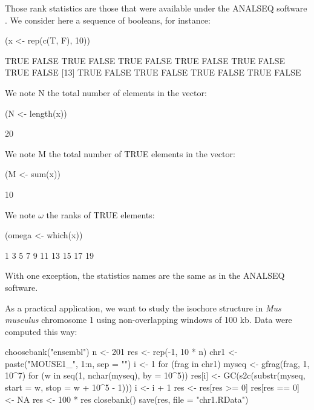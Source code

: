 \documentclass{article}
\begin{document}
Those rank statistics are those that were available under the ANALSEQ
software \cite{analseq, acnuc1984}. We consider here a sequence
of booleans, for instance:

\begin{Schunk}
\begin{Sinput}
 (x <- rep(c(T, F), 10))
\end{Sinput}
\begin{Soutput}
 [1]  TRUE FALSE  TRUE FALSE  TRUE FALSE  TRUE FALSE  TRUE FALSE  TRUE FALSE
[13]  TRUE FALSE  TRUE FALSE  TRUE FALSE  TRUE FALSE
\end{Soutput}
\end{Schunk}

We note $\mathrm{N}$ the total number of elements in the vector:

\begin{Schunk}
\begin{Sinput}
 (N <- length(x))
\end{Sinput}
\begin{Soutput}
[1] 20
\end{Soutput}
\end{Schunk}

We note $\mathrm{M}$ the total number of TRUE elements in the vector:

\begin{Schunk}
\begin{Sinput}
 (M <- sum(x))
\end{Sinput}
\begin{Soutput}
[1] 10
\end{Soutput}
\end{Schunk}

We note $\omega$ the ranks of TRUE elements:

\begin{Schunk}
\begin{Sinput}
 (omega <- which(x))
\end{Sinput}
\begin{Soutput}
 [1]  1  3  5  7  9 11 13 15 17 19
\end{Soutput}
\end{Schunk}

With one exception, the statistics names are the same as in the ANALSEQ software.

As a practical application, we want to study the isochore structure in \textit{Mus
musculus} chromosome 1 using non-overlapping windows of 100 kb. Data were 
computed this way:

%
%
\begin{Schunk}
\begin{Sinput}
 choosebank("ensembl")
 n <- 201
 res <- rep(-1, 10 * n)
 chr1 <- paste("MOUSE1_", 1:n, sep = "")
 i <- 1
 for (frag in chr1) {
     myseq <- gfrag(frag, 1, 10^7)
     for (w in seq(1, nchar(myseq), by = 10^5)) {
         res[i] <- GC(s2c(substr(myseq, start = w, stop = w + 
             10^5 - 1)))
         i <- i + 1
     }
 }
 res <- res[res >= 0]
 res[res == 0] <- NA
 res <- 100 * res
 closebank()
 save(res, file = "chr1.RData")
\end{Sinput}
\end{Schunk}
\end{document}
